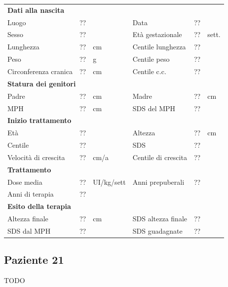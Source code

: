 \begin{table}[!h]
\begin{tabular}{lrllrl}
\toprule
\multicolumn{6}{l}{\textbf{Dati alla nascita}}\\
Luogo 		& \multicolumn{2}{l}{??} 	& Data 					& \multicolumn{2}{l}{??} 	\\
Sesso 		& \multicolumn{2}{l}{??} 	& Età gestazionale 		& ?? 		& sett.\\
Lunghezza 	& ?? 		& cm 				& Centile lunghezza		& ?? 		\\
Peso 		& ?? 		& g					& Centile peso			& ?? 		\\
Circonferenza cranica	& ?? 		& cm 	& Centile c.c.			& ?? \\
\midrule
\multicolumn{6}{l}{\textbf{Statura dei genitori}}\\
Padre 		& ?? & cm 	& Madre 				& ?? & cm \\
MPH 		& ?? & cm 	& SDS del MPH 			& ??\\
\midrule
\multicolumn{6}{l}{\textbf{Inizio trattamento}} \\
Età	& ?? & 		& Altezza 				& ?? & cm  \\
Centile & ?? 	 &		& SDS		& ?? \\
Velocità di crescita & ?? & cm/a	& Centile di crescita & ??\\
\midrule
\multicolumn{6}{l}{\textbf{Trattamento}} \\
Dose media		& ?? & UI/kg/sett & Anni prepuberali & ??\\
Anni di terapia & ??\\
\midrule
\multicolumn{6}{l}{\textbf{Esito della terapia}} \\
Altezza finale			& ?? & cm 	& SDS altezza finale		& ??\\
SDS dal MPH				& ?? &		& SDS guadagnate 			& ??\\
\bottomrule
\end{tabular}
\end{table}
\clearpage


\subsection*{Paziente 21}

TODO

